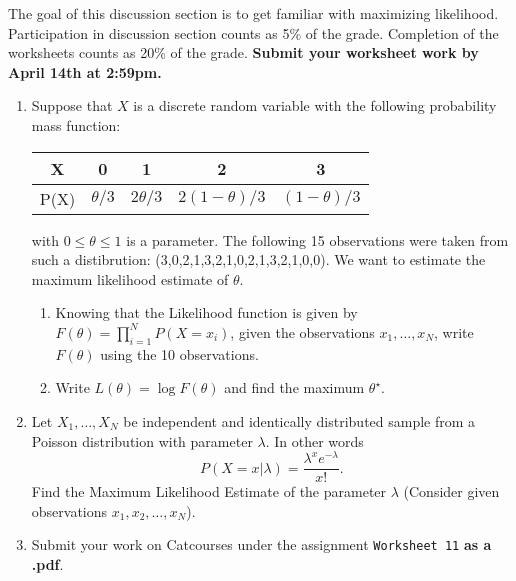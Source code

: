 \documentclass[11pt]{article}
\begin{document}
The goal of this discussion section is to get familiar with maximizing likelihood.\\

Participation in discussion section counts as 5\% of the grade. Completion of the worksheets counts as 20\% of the grade. \textbf{Submit your worksheet work by {April 14th} at 2:59pm.}





\begin{enumerate}
\item Suppose that $X$ is a discrete random variable with the following probability mass function:
\begin{center}
\begin{tabular}{|c|c|c|c|c|}
X & 0 & 1 & 2 & 3 \\
\hline
P(X) & $ \theta /3$ & $ 2 \theta /3$ & $2 (1 - \theta)/3$ & $(1-\theta)/3$
\end{tabular}
\end{center}
with $0 \leq \theta \leq 1$ is a parameter. The following 15 observations were taken from such a distibrution: (3,0,2,1,3,2,1,0,2,1,3,2,1,0,0). We want to estimate the maximum likelihood estimate of $\theta$.
\begin{enumerate}
\item Knowing that the Likelihood function is given by $F(\theta) = \prod \limits_{i  = 1}^N P(X = x_i)$, given the observations $x_1, \dots, x_N$, write $F(\theta)$ using the 10 observations.
\item Write $L(\theta) = \log F(\theta)$ and find the maximum $\theta^\star$.
\end{enumerate}
\item Let $X_1, \dots, X_N$ be independent and identically distributed sample from a Poisson distribution with parameter $\lambda$. In other words \[ P (X = x | \lambda) = \frac{ \lambda^x e^{-\lambda}}{x !}.\]
Find the Maximum Likelihood Estimate of the parameter $\lambda$ (Consider given observations $x_1, x_2,\dots, x_N$).
\item Submit your work on Catcourses under the assignment \texttt{Worksheet 11} \textbf{as a .pdf}. 
\end{enumerate}
\end{document}
